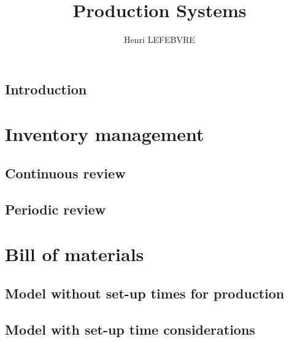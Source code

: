 \documentclass{report}
\title{Production Systems}
\author{Henri LEFEBVRE}
\begin{document}
    \maketitle
    \tableofcontents

    \setlength\parskip{0.5cm}

    \chapter*{Introduction}
    

    \part{Inventory management}
    \chapter{Continuous review}
    

    \chapter{Periodic review}
    

    \part{Bill of materials}
    \chapter{Model without set-up times for production}

    \chapter{Model with set-up time considerations}

    \listoffigures
\end{document}

